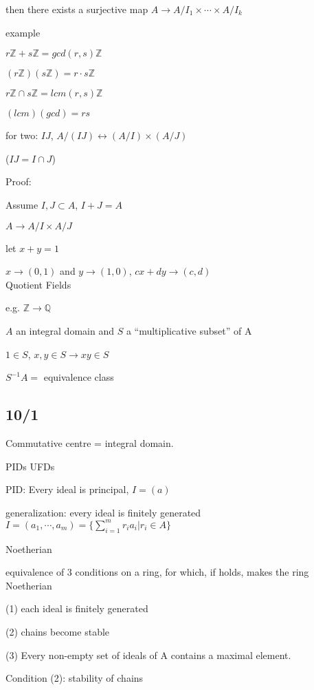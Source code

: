 \documentclass[12pt]{article}
\newcommand{\inv}{^{-1}}
\begin{document}
then there exists a surjective map $A \to A/I_1 \times \cdots \times A/I_k$

\noindent
example

$r\mathds{Z} + s\mathds{Z} = gcd(r, s)\mathds{Z}$

$(r\mathds{Z})(s\mathds{Z}) = r\cdot s\mathds{Z}$

$r\mathds{Z} \cap s\mathds{Z} = lcm(r, s)\mathds{Z}$

$(lcm)(gcd) = rs$

\noindent
for two: $IJ$, $A/(IJ) \leftrightarrow (A/I) \times (A/J)$

($IJ = I \cap J$)

\noindent
Proof:

Assume $I, J \subset A$, $I + J = A$

$A \to A/I \times A/J$

let $x + y = 1$

$x \to (0, 1)$ and $y \to (1, 0)$, $cx + dy \to (c, d)$\\

\noindent
Quotient Fields

e.g. $\mathds{Z} \to \mathds{Q}$

$A$ an integral domain and $S$ a ``multiplicative subset'' of A

$1 \in S$, $x, y \in S \to xy \in S$

$S\inv A = $ equivalence class

\subsection{10/1}

\noindent
Commutative centre = integral domain.

\noindent
PIDs UFDs

\noindent
PID: Every ideal is principal, $I = (a)$

generalization: every ideal is finitely generated $I = (a_1, \cdots, a_m) = \{\sum_{i=1}^mr_ia_i | r_i \in A\}$

Noetherian

\noindent
equivalence of 3 conditions on a ring, for which, if holds, makes the ring Noetherian

(1) each ideal is finitely generated

(2) chains become stable

(3) Every non-empty set of ideals of A contains a maximal element.

\noindent
Condition (2): stability of chains
\end{document}
